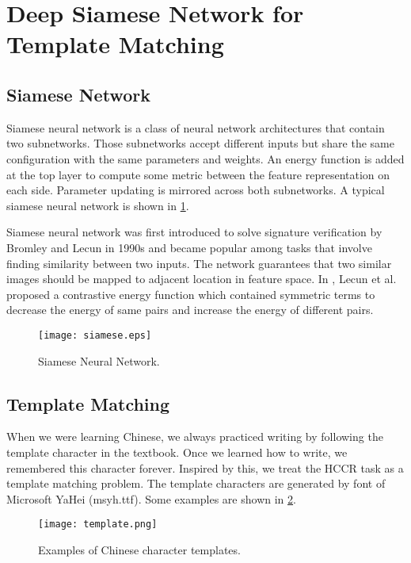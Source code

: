 \documentclass[conference]{IEEEtran}
\begin{document}
\section{Deep Siamese Network for Template Matching}
\label{Deep Siamese Network for Template Matching}

\subsection{Siamese Network}

Siamese neural network is a class of neural network architectures that contain two subnetworks. Those subnetworks accept different inputs but share the same configuration with the same parameters and weights. An energy function is added at the top layer to compute some metric between the feature representation on each side. Parameter updating is mirrored across both subnetworks. A typical siamese neural network is shown in \figurename \ref{siamese}.


Siamese neural network was first introduced to solve signature verification by Bromley and Lecun in 1990s\cite{bromley1994signature} and became popular among tasks that involve finding similarity between two inputs. The network guarantees that two similar images should be mapped to adjacent location in feature space. In \cite{chopra2005learning}, Lecun et al. proposed a contrastive energy function which contained symmetric terms to decrease the energy of same pairs and increase the energy of different pairs.

\begin{figure}[htb]
	\centering
	\texttt{[image: siamese.eps]}
	\caption{Siamese Neural Network.}
	\label{siamese}
\end{figure}



\subsection{Template Matching}
When we were learning Chinese, we always practiced writing by following the template character in the textbook. Once we learned how to write, we remembered this character forever. Inspired by this, we treat the HCCR task as a template matching problem. The template characters are generated by font of Microsoft YaHei (msyh.ttf). Some examples are shown in \figurename \ref{template}. 

\begin{figure}[htb]
	\centering
	\texttt{[image: template.png]}
	\caption{Examples of Chinese character templates.}
	\label{template}
\end{figure}
\end{document}
